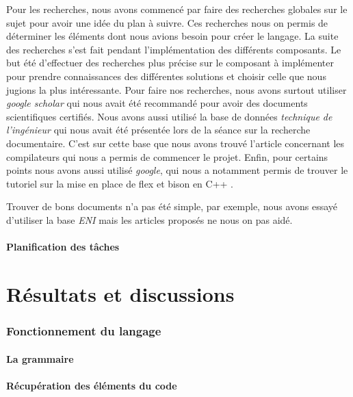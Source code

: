 \documentclass[a4paper]{article}%
\begin{document}
Pour les recherches, nous avons commencé par faire des recherches globales sur le
sujet pour avoir une idée du plan à suivre. Ces recherches nous on permis de
déterminer les éléments dont nous avions besoin pour créer le langage. La suite
des recherches s'est fait pendant l'implémentation des différents composants. Le
but été d'effectuer des recherches plus précise sur le composant à implémenter
pour prendre connaissances des différentes solutions et choisir celle que nous
jugions la plus intéressante. Pour faire nos recherches, nous avons surtout
utiliser \textit{google scholar} qui nous avait été recommandé pour avoir des
documents scientifiques certifiés. Nous avons aussi utilisé la base de données
\textit{technique de l'ingénieur} qui nous avait été présentée lors de la séance
sur la recherche documentaire. C'est sur cette base que nous avons trouvé
l'article concernant les compilateurs \cite{compilerTICH} qui nous a permis de
commencer le projet. Enfin, pour certains points nous avons aussi utilisé
\textit{google}, qui nous a notamment permis de trouver le tutoriel sur la mise
en place de flex et bison en C++ \cite{cppparsing}.

Trouver de bons documents n'a pas été simple, par exemple, nous avons essayé
d'utiliser la base \textit{ENI} mais les articles proposés ne nous on pas aidé.

\subsection{Planification des tâches}


\clearpage
\part{Résultats et discussions}

\section{Fonctionnement du langage}

\subsection{La grammaire}

\subsection{Récupération des éléments du code}
\end{document}

